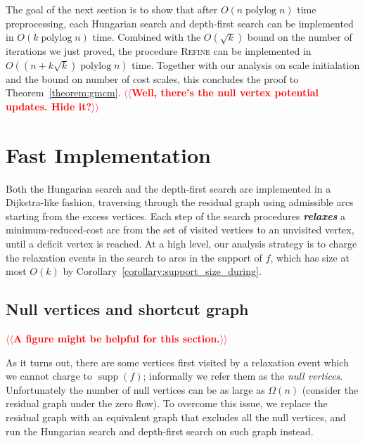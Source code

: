 \documentclass[a4paper,UKenglish]{socg-lipics-v2018}
\makeatletter
\def\note#1{\textcolor{red}{{#1}}}
\def\polylog{\mathop{\mathrm{polylog}}}
\def\supp{\operatorname{supp}}
\theoremstyle{plain}
\numberwithin{figure}{section}
\def\EMPH#1{\textbf{\emph{\boldmath #1}}}
\def\n@te#1{\textsf{\boldmath \textbf{$\langle\!\langle$#1$\rangle\!\rangle$}}\leavevmode}
\def\note#1{\textcolor{red}{\n@te{#1}}}
\makeatother
\begin{document}

The goal of the next section is to show that after $O(n \polylog n)$ time preprocessing, each Hungarian search and depth-first search can be implemented in $O(k \polylog n)$ time.
%
Combined with the $O(\sqrt{k})$ bound on the number of iterations we just proved, the procedure \textsc{Refine} can be implemented in $O((n+k\sqrt{k}) \polylog n)$ time.  Together with our analysis on scale initialation and the bound on number of cost scales, this concludes the proof to Theorem~\ref{theorem:gmcm}.
\note{Well, there's the null vertex potential updates.  Hide it?}

\section{Fast Implementation}

Both the Hungarian search and the depth-first search are implemented in a Dijkstra-like fashion, traversing through the residual graph using admissible arcs starting from the excess vertices.
Each step of the search procedures \EMPH{relaxes} a minimum-reduced-cost arc from the set of visited vertices to an unvisited vertex, until a deficit vertex is reached.
%
At a high level, our analysis strategy is to charge the relaxation events in the search to arcs in the support of $f$, which has size at most $O(k)$ by Corollary~\ref{corollary:support_size_during}.

\subsection{Null vertices and shortcut graph}

\note{A figure might be helpful for this section.}

As it turns out, there are some vertices first visited by a relaxation event which we cannot charge to $\supp(f)$; informally we refer them as the \emph{null vertices}.
Unfortunately the number of null vertices can be as large as $\Omega(n)$
(consider the residual graph under the zero flow).
%
To overcome this issue, we replace the residual graph with an equivalent graph that excludes all the null vertices,
and run the Hungarian search and depth-first search on such graph instead.
\end{document}
